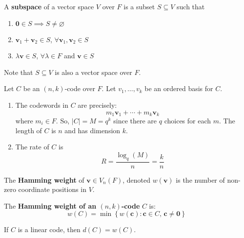 \begin{defbox}
    \begin{definition}
        A \textbf{subspace} of a vector space $ V $ over $ F $ is a subset
        $ S\subseteq V $ such that
        \begin{enumerate}[label=V\arabic*]
            \item $ \bm{0}\in S \implies S\neq \varnothing $
            \item $ \bm{v}_1+\bm{v}_2\in S $, $ \forall \bm{v}_1,\bm{v}_2\in S $
            \item $ \lambda \bm{v}\in S $, $ \forall \lambda\in F $ and $ \bm{v}\in S $
        \end{enumerate}
        Note that $ S\subseteq V $ is also a vector space over $ F $.
    \end{definition}
\end{defbox}

Let $ C $ be an $ (n,k) $-code over $ F $. Let $ v_1,\ldots,v_k $ be
an ordered basis for $ C $.
\begin{enumerate}[label=(\arabic*)]
    \item The codewords in $ C $ are precisely:
          \[ m_1\bm{v}_1+\cdots +m_k\bm{v}_k \]
          where $ m_i\in F $. So, $ |C|=M=q^k $ since there are $ q $ choices for each $ m $.
          The length of $ C $ is $ n $ and has dimension $ k $.
    \item The rate of $ C $ is
          \[ R=\frac{\log_q(M)}{n} =\frac{k}{n} \]
\end{enumerate}

\begin{defbox}
    \begin{definition}
        The \textbf{Hamming weight} of $ \bm{v}\in V_n(F) $, denoted
        $ w(\bm{v}) $ is the number of non-zero coordinate positions in $ V $.
    \end{definition}
\end{defbox}

\begin{defbox}
    \begin{definition}
        The \textbf{Hamming weight of an $ (n,k) $-code} $ C $ is:
        \[ w(C)=\min \left\{ w(\bm{c}):\bm{c}\in C,\,\bm{c}\neq \bm{0}\right\} \]
    \end{definition}
\end{defbox}

\begin{thmbox}
    \begin{theorem}
        If $ C $ is a linear code, then $ d(C)=w(C) $.
    \end{theorem}
\end{thmbox}


